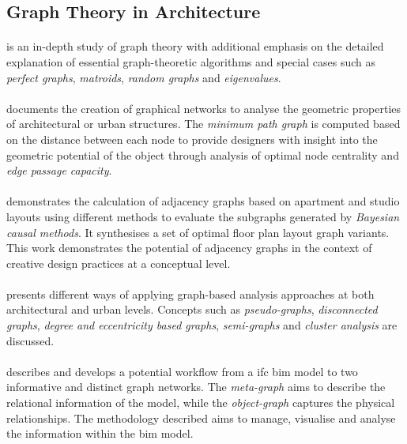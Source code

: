 \documentclass[a4paper, 12pt]{report}
\begin{document}
\subsection*{Graph Theory in Architecture}\label{subsec:graph-theory-in-architecture-fr}

\paragraph{\cite{west2001introduction}} is an in-depth study of graph theory with additional emphasis on the detailed explanation of essential graph-theoretic algorithms and special cases such as \textit{perfect graphs}, \textit{matroids}, \textit{random graphs} and \textit{eigenvalues}.

\paragraph{\cite{napong2004graph}} documents the creation of graphical networks to analyse the geometric properties of architectural or urban structures. The \textit{minimum path graph} is computed based on the distance between each node to provide designers with insight into the geometric potential of the object through analysis of optimal node \gls{centrality} and \textit{edge passage capacity}.

\paragraph{\cite{vandromme2009interactive}} demonstrates the calculation of adjacency graphs based on apartment and studio layouts using different methods to evaluate the subgraphs generated by \textit{Bayesian causal methods}. It synthesises a set of optimal floor plan layout graph variants. This work demonstrates the potential of adjacency graphs in the context of creative design practices at a conceptual level.

\paragraph{\cite{lakshmi2017graph}} presents different ways of applying graph-based analysis approaches at both architectural and urban levels. Concepts such as \textit{pseudo-graphs}, \textit{disconnected graphs}, \textit{degree and eccentricity based graphs}, \textit{semi-graphs} and \textit{cluster analysis} are discussed.

\paragraph{\cite{nahar2017applying}} describes and develops a potential workflow from a \acrshort{ifc} \acrshort{bim} model to two informative and distinct graph networks. The \textit{meta-graph} aims to describe the relational information of the model, while the \textit{object-graph} captures the physical relationships. The methodology described aims to manage, visualise and analyse the information within the \acrshort{bim} model.
\end{document}
